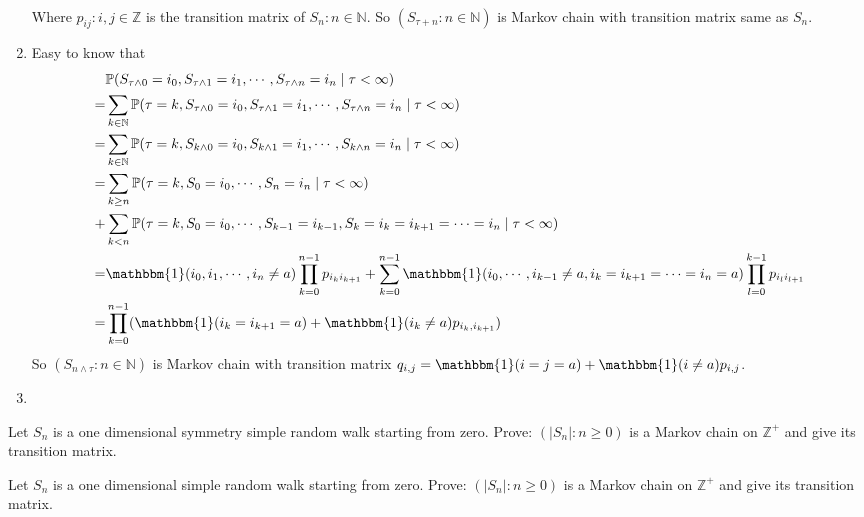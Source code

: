 \documentclass{ctexart}
\begin{document}
\begin{solution}
\begin{enumerate}
\[\begin{aligned}
        \end{aligned}
      \]
      Where \(p_{ij}:i,j \in \mathbb{Z}\) is the transition matrix of \(S_n:n \in \mathbb{N}\).
      So \((S_{\tau+n}:n \in \mathbb{N})\) is Markov chain with transition matrix same as \(S_n\).
    \item Easy to know that
      \[
        \begin{aligned}
           & \mathbb{P}(S_{\tau \wedge 0}=i_0,S_{\tau\wedge 1}=i_1,\cdots,S_{\tau\wedge n}=i_n \mid \tau<\infty)
          \\= & \sum_{k \in \mathbb{N}}\mathbb{P}(\tau=k,S_{\tau \wedge 0}=i_0,S_{\tau\wedge 1}=i_1,\cdots,S_{\tau\wedge n}=i_n \mid \tau<\infty)
          \\= & \sum_{k \in \mathbb{N}}\mathbb{P}(\tau=k,S_{k \wedge 0}=i_0,S_{k\wedge 1}=i_1,\cdots,S_{k\wedge n}=i_n \mid \tau<\infty)
          \\= & \sum_{k \geq n} \mathbb{P}(\tau =k,S_0=i_0,\cdots,S_n=i_n \mid \tau<\infty)
          \\+ & \sum_{k < n} \mathbb{P}(\tau =k,S_0=i_0,\cdots,S_{k-1}=i_{k-1},S_k=i_k=i_{k+1} =\cdots=i_n \mid \tau<\infty)
          \\= & \mathbbm{1}(i_0,i_1,\cdots,i_n \neq a) \prod_{k=0}^{n-1} p_{i_k i_{k+1}} + \sum_{k=0}^{n-1} \mathbbm{1}(i_0,\cdots,i_{k-1} \neq a,i_k=i_{k+1}=\cdots=i_n=a) \prod_{l=0}^{k-1} p_{i_l i_{l+1}}
          \\=&\prod_{k=0}^{n-1} (\mathbbm{1}(i_k=i_{k+1}=a)+\mathbbm{1}(i_k \neq a)p_{i_k,i_{k+1}})
        \end{aligned}
      \]
      So \((S_{n \wedge \tau}:n \in \mathbb{N})\) is Markov chain with transition matrix \(q_{i,j}=\mathbbm{1}(i=j=a)+\mathbbm{1}(i \neq a)p_{i,j}\).
    \item
  \end{enumerate}
\end{solution}

\begin{problem}\label{pro:3}
  Let \(S_n\) is a one dimensional symmetry simple random walk starting from zero.
  Prove: \((|S_n|: n \geq 0)\) is a Markov chain on \(\mathbb{Z}^+\) and give its transition matrix.
\end{problem}
\begin{problem}\label{pro:4}
  Let \(S_n\) is a one dimensional simple random walk starting from zero.
  Prove: \((|S_n|: n \geq 0)\) is a Markov chain on \(\mathbb{Z}^+\) and give its transition matrix.
\end{problem}
\end{document}
